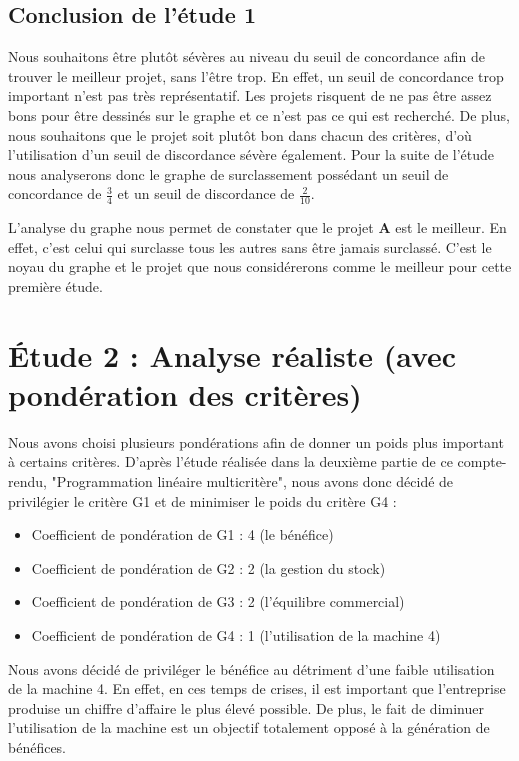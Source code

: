\documentclass[a4paper,10pt]{article}
\begin{document}
\subsection{Conclusion de l'étude 1}

Nous souhaitons être plutôt sévères au niveau du seuil de concordance afin de trouver le meilleur projet, sans l'être trop. En effet, un seuil de concordance trop important n'est pas très représentatif. Les projets risquent de ne pas être assez bons pour être dessinés sur le graphe et ce n'est pas ce qui est recherché. De plus, nous souhaitons que le projet soit plutôt bon dans chacun des critères, d'où l'utilisation d'un seuil de discordance sévère également. Pour la suite de l'étude nous analyserons donc le graphe de surclassement  possédant un seuil de concordance de $\frac{3}{4}$ et un seuil de discordance de $\frac{2}{10}$.

L'analyse du graphe  nous permet de constater que le projet \textbf{A} est le meilleur. En effet, c'est celui qui surclasse tous les autres sans être jamais surclassé. C'est le noyau du graphe et le projet que nous considérerons comme le meilleur pour cette première étude.

\section{Étude 2 : Analyse réaliste (avec pondération des critères)}

Nous avons choisi plusieurs pondérations afin de donner un poids plus important à certains critères. D'après l'étude réalisée dans la deuxième partie de ce compte-rendu, "Programmation linéaire multicritère", nous avons donc décidé de privilégier le critère G1 et de minimiser le poids du critère G4 :

\begin{itemize}
\item Coefficient de pondération de G1 : 4 (le bénéfice)
\item Coefficient de pondération de G2 : 2 (la gestion du stock)
\item Coefficient de pondération de G3 : 2 (l'équilibre commercial)
\item Coefficient de pondération de G4 : 1 (l'utilisation de la machine 4)
\end{itemize}

Nous avons décidé de priviléger le bénéfice au détriment d'une faible utilisation de la machine 4. En effet, en ces temps de crises, il est important que l'entreprise produise un chiffre d'affaire le plus élevé possible. De plus, le fait de diminuer l'utilisation de la machine est un objectif totalement opposé à la génération de bénéfices.
\end{document}

